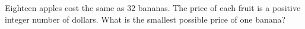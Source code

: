 Eighteen apples cost the same as 32 bananas. The price of each fruit is a positive integer number of dollars. What is the smallest possible price of one banana?
